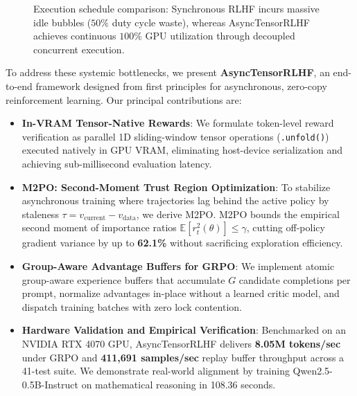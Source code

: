\documentclass[10pt,twocolumn,letterpaper]{article}
\begin{document}
\begin{figure}[t]
{
    }
    \caption{Execution schedule comparison: Synchronous RLHF incurs massive idle bubbles ($50\%$ duty cycle waste), whereas AsyncTensorRLHF achieves continuous $100\%$ GPU utilization through decoupled concurrent execution.}
    \label{fig:timeline}
\end{figure}

To address these systemic bottlenecks, we present \textbf{AsyncTensorRLHF}, an end-to-end framework designed from first principles for asynchronous, zero-copy reinforcement learning. Our principal contributions are:

\begin{itemize}
    \item \textbf{In-VRAM Tensor-Native Rewards}: We formulate token-level reward verification as parallel 1D sliding-window tensor operations (\texttt{.unfold()}) executed natively in GPU VRAM, eliminating host-device serialization and achieving sub-millisecond evaluation latency.
    \item \textbf{M2PO: Second-Moment Trust Region Optimization}: To stabilize asynchronous training where trajectories lag behind the active policy by staleness $\tau = v_{\text{current}} - v_{\text{data}}$, we derive M2PO. M2PO bounds the empirical second moment of importance ratios $\mathbb{E}[r_t^2(\theta)] \le \gamma$, cutting off-policy gradient variance by up to \textbf{62.1\%} without sacrificing exploration efficiency.
    \item \textbf{Group-Aware Advantage Buffers for GRPO}: We implement atomic group-aware experience buffers that accumulate $G$ candidate completions per prompt, normalize advantages in-place without a learned critic model, and dispatch training batches with zero lock contention.
    \item \textbf{Hardware Validation and Empirical Verification}: Benchmarked on an NVIDIA RTX 4070 GPU, AsyncTensorRLHF delivers \textbf{8.05M tokens/sec} under GRPO and \textbf{411,691 samples/sec} replay buffer throughput across a 41-test suite. We demonstrate real-world alignment by training Qwen2.5-0.5B-Instruct on mathematical reasoning in 108.36 seconds.
\end{itemize}
\end{document}
